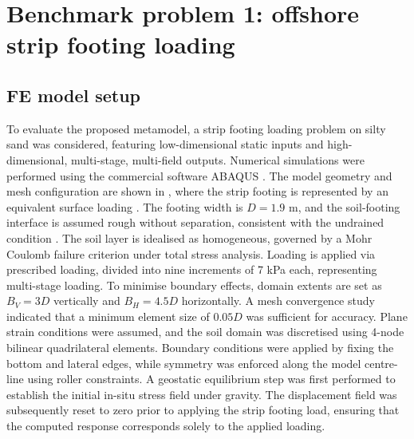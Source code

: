 \section{Benchmark problem 1: offshore strip footing loading}\label{sec:example1}\noindent
\subsection{FE model setup}\noindent
To evaluate the proposed metamodel, a strip footing loading problem on silty sand was considered, featuring low-dimensional static inputs and high-dimensional, multi-stage, multi-field outputs. Numerical simulations were performed using the commercial software ABAQUS \parencite{abaqus2022}. The model geometry and mesh configuration are shown in , where the strip footing is represented by an equivalent surface loading \parencite{houlsby1999,xiao2018,haghighi2019}. The footing width is $D = 1.9$ m, and the soil-footing interface is assumed rough without separation, consistent with the undrained condition \parencite{yang2021,huang2021,yang2022,zhou2023,yang2024,peng2025,wang2025} . The soil layer is idealised as homogeneous, governed by a Mohr Coulomb failure criterion under total stress analysis. Loading is applied via prescribed loading, divided into nine increments of 7 kPa each, representing multi-stage loading. To minimise boundary effects, domain extents are set as $B_V=3D$ vertically and $B_H=4.5D$ horizontally. A mesh convergence study indicated that a minimum element size of $0.05D$ was sufficient for accuracy. Plane strain conditions were assumed, and the soil domain was discretised using 4-node bilinear quadrilateral elements. Boundary conditions were applied by fixing the bottom and lateral edges, while symmetry was enforced along the model centre-line using roller constraints. A geostatic equilibrium step was first performed to establish the initial in-situ stress field under gravity. The displacement field was subsequently reset to zero prior to applying the strip footing load, ensuring that the computed response corresponds solely to the applied loading.
\setcounter{figure}{5} 

